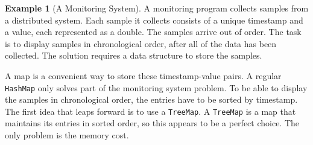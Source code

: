 \documentclass{book}
\theoremstyle{definition}
\newtheorem{example}{Example}
\begin{document}








 \begin{example}[A Monitoring System]
   A monitoring program collects samples from a distributed
   system. Each sample it collects consists of a unique timestamp and a
   value, each represented as a double. The samples arrive out of
   order. The task is to display samples in chronological order, after
   all of the data has been collected. The solution requires a data
   structure to store the samples. 
\end{example}


A map is a convenient way to store these timestamp-value pairs. A regular \texttt{HashMap} only solves part of the monitoring system problem. To be able to display the samples in chronological order, the entries have to be sorted by timestamp. 
The first idea that leaps forward is to use a \texttt{TreeMap}. A \texttt{TreeMap} is a map that maintains its entries in sorted order, so this appears to be a perfect choice. The only problem is the memory cost.
\end{document}
